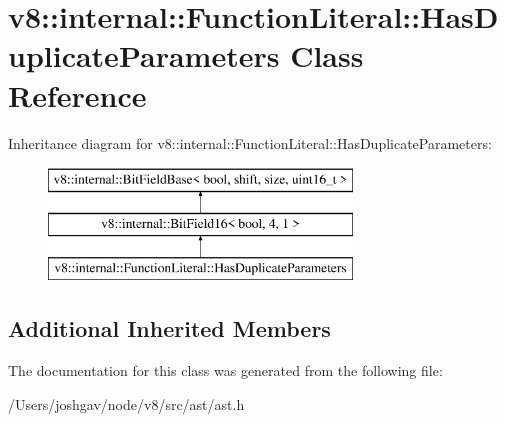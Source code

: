 \hypertarget{classv8_1_1internal_1_1_function_literal_1_1_has_duplicate_parameters}{}\section{v8\+:\+:internal\+:\+:Function\+Literal\+:\+:Has\+Duplicate\+Parameters Class Reference}
\label{classv8_1_1internal_1_1_function_literal_1_1_has_duplicate_parameters}
Inheritance diagram for v8\+:\+:internal\+:\+:Function\+Literal\+:\+:Has\+Duplicate\+Parameters\+:\begin{figure}[H]
\begin{center}
\leavevmode
\includegraphics[height=3.000000cm]{classv8_1_1internal_1_1_function_literal_1_1_has_duplicate_parameters}
\end{center}
\end{figure}
\subsection*{Additional Inherited Members}


The documentation for this class was generated from the following file\+:\begin{DoxyCompactItemize}
\item 
/\+Users/joshgav/node/v8/src/ast/ast.\+h\end{DoxyCompactItemize}

